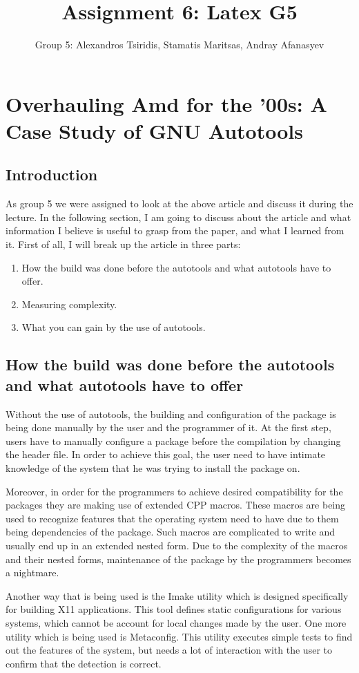 \documentclass[11pt]{article}
\title{Assignment 6: Latex G5}
\author{Group 5: Alexandros Tsiridis, Stamatis Maritsas, Andray Afanasyev}
\date{}
\begin{document}
\maketitle

\nocite{*}
\section{Overhauling Amd for the ’00s: A Case Study of GNU Autotools}
\subsection{Introduction}
As group 5 we were assigned to look at the above article and discuss it during the lecture. In the following section, I am going to discuss about the article and what information I believe is useful to grasp from the paper, and what I learned from it. First of all, I will break up the article in three parts:
\begin{enumerate}
\item How the build was done before the autotools and what autotools have to offer.
\item Measuring complexity.
\item What you can gain by the use of autotools.
\end{enumerate}
\subsection{How the build was done before the autotools and what autotools have to offer}
Without the use of autotools, the building and configuration of the package is being done manually by the user and the programmer of it. At the first step, users have to manually configure a package before the compilation by changing the header file. In order to achieve this goal, the user need to have intimate knowledge of the system that he was trying to install the package on.

Moreover, in order for the programmers to achieve desired compatibility for the packages they are making use of extended CPP macros. These macros are being used to recognize features that the operating system need to have due to them being dependencies of the package. Such macros are complicated to write and usually end up in an extended nested form. Due to the complexity of the macros and their nested forms, maintenance of the package by the programmers becomes a nightmare.

Another way that is being used is the Imake utility which is designed specifically for building X11 applications. This tool defines static configurations for various systems, which cannot be account for local changes made by the user. One more utility which is being used is Metaconfig. This utility executes simple tests to find out the features of the system, but needs a lot of interaction with the user to confirm that the detection is correct.
\end{document}
